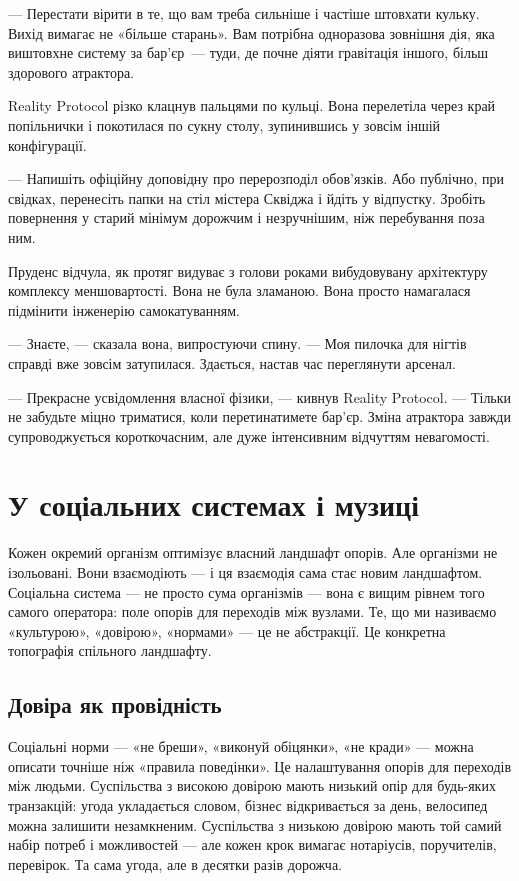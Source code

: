 \documentclass[12pt, a4paper, openany]{book}
\begin{document}
\begin{realitybox}
--- Перестати вірити в те, що вам треба сильніше і частіше штовхати кульку. Вихід вимагає не «більше старань». Вам потрібна одноразова зовнішня дія, яка виштовхне систему за бар'єр~--- туди, де почне діяти гравітація іншого, більш здорового атрактора.

Reality Protocol різко клацнув пальцями по кульці. Вона перелетіла через край попільнички і покотилася по сукну столу, зупинившись у зовсім іншій конфігурації.

--- Напишіть офіційну доповідну про перерозподіл обов'язків. Або публічно, при свідках, перенесіть папки на стіл містера Сквіджа і йдіть у відпустку. Зробіть повернення у старий мінімум дорожчим і незручнішим, ніж перебування поза ним.

\medskip
Пруденс відчула, як протяг видуває з голови роками вибудовувану архітектуру комплексу меншовартості. Вона не була зламаною. Вона просто намагалася підмінити інженерію самокатуванням.

--- Знаєте, --- сказала вона, випростуючи спину. --- Моя пилочка для нігтів справді вже зовсім затупилася. Здається, настав час переглянути арсенал.

--- Прекрасне усвідомлення власної фізики, --- кивнув Reality Protocol. --- Тільки не забудьте міцно триматися, коли перетинатимете бар'єр. Зміна атрактора завжди супроводжується короткочасним, але дуже інтенсивним відчуттям невагомості.
\end{realitybox}

\chapter{У соціальних системах і музиці}

Кожен окремий організм оптимізує власний ландшафт опорів. Але організми не ізольовані. Вони взаємодіють — і ця взаємодія сама стає новим ландшафтом. Соціальна система — не просто сума організмів — вона є вищим рівнем того самого оператора: поле опорів для переходів між вузлами. Те, що ми називаємо «культурою», «довірою», «нормами» — це не абстракції. Це конкретна топографія спільного ландшафту.

\section{Довіра як провідність}

Соціальні норми --- «не бреши», «виконуй обіцянки», «не кради» --- можна описати точніше ніж «правила поведінки». Це налаштування опорів для переходів між людьми. Суспільства з високою довірою мають низький опір для будь-яких транзакцій: угода укладається словом, бізнес відкривається за день, велосипед можна залишити незамкненим. Суспільства з низькою довірою мають той самий набір потреб і можливостей --- але кожен крок вимагає нотаріусів, поручителів, перевірок. Та сама угода, але в десятки разів дорожча.
\end{document}
